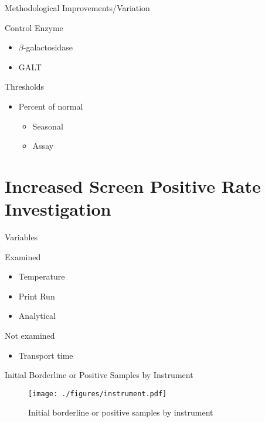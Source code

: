 \documentclass[presentation, smaller]{beamer}
\begin{document}
\begin{frame}[label={sec:orgheadline10}]{Methodological Improvements/Variation}
\begin{block}{Control Enzyme}
\begin{itemize}
\item \(\beta\)-galactosidase
\item GALT
\end{itemize}
\end{block}

\begin{block}{Thresholds}
\begin{itemize}
\item Percent of normal
\begin{itemize}
\item Seasonal
\item Assay
\end{itemize}
\end{itemize}
\end{block}
\end{frame}

\section{Increased Screen Positive Rate Investigation}
\label{sec:orgheadline22}

\begin{frame}[label={sec:orgheadline12}]{Variables}
\begin{block}{Examined}
\begin{itemize}
\item Temperature
\item Print Run
\item Analytical
\end{itemize}
\end{block}

\begin{block}{Not examined}
\begin{itemize}
\item Transport time
\end{itemize}
\end{block}
\end{frame}

\begin{frame}[label={sec:orgheadline13}]{Initial Borderline or Positive Samples by Instrument}
\begin{figure}[htb]
\centering
\texttt{[image: ./figures/instrument.pdf]}
\caption{\label{fig:instrument}
Initial borderline or positive samples by instrument}
\end{figure}
\end{frame}
\end{document}
